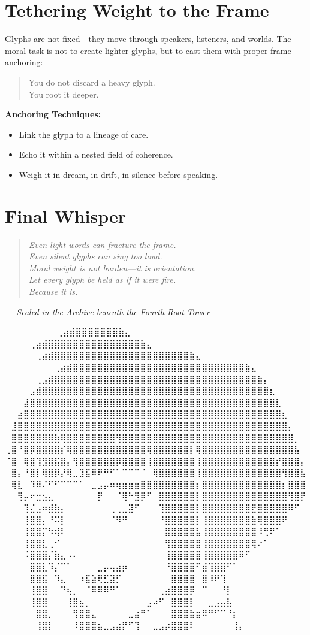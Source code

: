 \section*{Tethering Weight to the Frame}
Glyphs are not fixed—they move through speakers, listeners, and worlds.  
The moral task is not to create lighter glyphs, but to cast them with proper frame anchoring:
\begin{quote}
You do not discard a heavy glyph.\\
You root it deeper.
\end{quote}

\noindent\textbf{Anchoring Techniques:}
\begin{itemize}
    \item Link the glyph to a lineage of care.
    \item Echo it within a nested field of coherence.
    \item Weigh it in dream, in drift, in silence before speaking.
\end{itemize}

\section*{Final Whisper}
\begin{quote}\itshape
Even light words can fracture the frame.\\
Even silent glyphs can sing too loud.\\
Moral weight is not burden—it is orientation.\\
Let every glyph be held as if it were fire.\\
Because it is.
\end{quote}

\begin{flushright}
\textit{— Sealed in the Archive beneath the Fourth Root Tower}
\end{flushright}

\iffalse
⠀⠀⠀⠀⠀⠀             ⠀⠀⢀⣴⣾⣿⣿⣿⣿⣿⣿⣿⣷⣄⠀⠀⠀⠀⠀⠀⠀⠀
⠀⠀⠀  ⠀      ⠀⠀⠀⠀⢀⣴⣾⣿⣿⣿⣿⣿⣿⣿⣿⣿⣿⣿⣿⣿⣿⣿⣷⣄⠀⠀⠀⠀⠀⠀⠀⠀
⠀⠀ ⠀   ⠀⠀⠀⠀⠀⢀⣴⣾⣿⣿⣿⣿⣿⣿⣿⣿⣿⣿⣿⣿⣿⣿⣿⣿⣿⣿⣿⣿⣿⣿⣷⣄⠀⠀⠀⠀⠀⠀⠀⠀
⠀⠀⠀⠀⠀⠀⠀⠀⢀⣴⣾⣿⣿⣿⣿⣿⣿⣿⣿⣿⣿⣿⣿⣿⣿⣿⣿⣿⣿⣿⣿⣿⣿⣿⣿⣿⣿⣿⣿⣷⣄⠀⠀⠀⠀⠀⠀⠀⠀
⠀⠀⠀⠀⠀⢀⣠⣾⣿⣿⣿⣿⣿⣿⣿⣿⣿⣿⣿⣿⣿⣿⣿⣿⣿⣿⣿⣿⣿⣿⣿⣿⣿⣿⣿⣿⣿⣿⣿⣿⣿⣷⡄⠀⠀⠀⠀⠀⠀
⠀⠀⠀⠀⣠⣾⣿⣿⣿⣿⣿⣿⣿⣿⣿⣿⣿⣿⣿⣿⣿⣿⣿⣿⣿⣿⣿⣿⣿⣿⣿⣿⣿⣿⣿⣿⣿⣿⣿⣿⣿⣿⣿⣆⠀⠀⠀⠀⠀
⠀⠀⠀⣼⣿⣿⣿⣿⣿⣿⣿⣿⣿⣿⣿⣿⣿⣿⣿⣿⣿⣿⣿⣿⣿⣿⣿⣿⣿⣿⣿⣿⣿⣿⣿⣿⣿⣿⣿⣿⣿⣿⣿⣿⣇⠀⠀⠀⠀
⠀⠀⣴⣿⣿⣿⣿⣿⣿⣿⣿⣿⣿⣿⣿⣿⣿⣿⣿⣿⣿⣿⣿⣿⣿⣿⣿⣿⣿⣿⣿⣿⣿⣿⣿⣿⣿⣿⣿⣿⣿⣿⣿⣿⣿⣆⠀⠀⠀
⠀⣸⣿⣿⣿⣿⣿⣿⣿⣿⣿⣿⣿⣿⣿⣿⣿⣿⣿⣿⣿⣿⣿⣿⣿⣿⣿⣿⣿⣿⣿⣿⣿⣿⣿⣿⣿⣿⣿⣿⣿⣿⣿⣿⣿⣿⡄⠀⠀
⠀⣿⣿⣿⣿⣿⣿⣿⣷⢿⣿⣿⣿⣿⣿⣿⣿⣿⢻⣿⣿⣿⣿⣿⣿⣿⣿⣿⣿⣿⣿⣿⣿⣿⣿⣿⣿⣿⣿⣿⣿⣿⣿⣿⣿⣿⣿⡀⠀
⢀⣿⠘⣿⡿⣿⣿⣿⣿⡎⢿⣿⣿⣿⣿⣿⣿⣿⣿⣿⣿⣿⣿⢿⣿⣿⣿⣿⣿⣿⡇⢿⣿⣿⣿⣿⣿⣿⣿⣿⣿⣿⣿⣿⣿⣿⣿⣧⠀
⠈⣿⠀⢿⣿⢹⣻⣿⣯⣿⡄⢻⣿⣿⣿⣿⣿⣿⡿⣿⣿⣿⣿⢸⣿⣿⣿⣿⣿⣿⣿⢸⣿⣿⣿⣿⣿⣿⣿⣿⣿⣿⣿⣿⡞⣿⣿⣿⡄
⠀⣿⡄⠘⣿⡇⢿⣿⡿⡜⢿⣀⣹⣯⠿⠟⠛⠋⠁⠉⠉⠉⠈⠀⢿⣿⣿⣿⣿⣿⣿⢸⣿⣿⣿⣿⣿⣿⣿⣿⣿⣿⣿⣿⣿⢻⣿⣿⣧
⠀⢿⣇⠀⠹⠿⠌⠋⠋⠉⠉⠉⠁⠀⣀⣠⡤⠶⢶⣶⣶⣶⣿⣿⣿⣿⣿⣿⣿⣿⣿⡆⣿⣿⣿⣿⣿⣿⣿⣿⣿⣿⣿⣿⣿⡆⣿⣿⣿
⠀⠀⢻⡤⠖⣒⣢⣄⠀⠀⠀⠀⠀⠀⠀⡟⠀⠀⠈⢿⠓⣻⡿⠋⠀⣿⣿⣿⣿⣿⣿⡇⣿⣿⣿⣿⣿⣿⣿⣿⣿⣿⣿⣿⣿⣿⢻⣿⡟
⠀⠀⠀⢹⣌⣠⠶⣾⣷⡄⠀⠀⠀⠀⠀⠀⠀⢀⢀⣀⣽⠋⠀⠀⠀⢹⣿⣿⣿⣿⣿⡇⣿⣿⣿⣿⣿⣿⣿⣿⣟⣿⣿⣿⣿⣿⠿⠋⠀
⠀⠀⠀⢸⣿⣿⡄⠘⠭⡇⠀⠀⠀⠀⠀⠀⠀⠈⠻⠛⠀⠀⠀⠀⠀⠘⣿⣿⣿⣿⣿⡇⢸⣿⣿⣿⣿⣿⣿⣿⣷⢿⣿⣿⣿⠟⠀⠀⠀
⠀⠀⠀⢸⣿⣿⡍⠳⢾⠇⠀⠀⠀⠀⠀⠀⠀⠀⠀⠀⠀⠀⠀⠀⠀⠀⣿⣿⣿⣿⣿⣧⢸⣿⣿⣿⣿⣿⣿⣿⣿⠸⢛⠟⠁⠀⠀⠀⠀
⠀⠀⠀⢸⣿⣿⣇⢀⠊⠀⠀⠀⠀⠀⠀⠀⠀⠀⠀⠀⠀⠀⠀⠀⠀⠀⢻⣿⣿⣿⣿⣿⢸⣿⣿⣿⣿⣿⣿⣿⢿⠔⠁⠀⠀⠀⠀⠀⠀
⠀⠀⠀⠨⣿⣿⣿⡌⣷⣄⠠⠄⠀⠀⠀⠀⠀⠀⠀⠀⠀⠀⠀⠀⠀⠀⢸⣿⣿⣿⣿⣿⢸⣿⣿⣿⣿⣿⠿⠋⠀⠀⠀⠀⠀⠀⠀⠀⠀
⠀⠀⠀⠀⣿⣿⣇⠹⡌⠉⠁⠀⠀⠀⠀⣀⡤⢤⣴⡶⠀⠀⠀⠀⠀⠀⠘⣿⣿⣿⣿⠋⣾⢹⣿⣿⠋⠁⠀⠀⠀⠀⠀⠀⠀⠀⠀⠀⠀
⠀⠀⠀⠀⣿⣿⣯⠀⠹⣄⠀⠀⠰⣯⣵⢟⣋⣽⡋⠀⠀⠀⠀⠀⠀⠀⠀⣿⣿⣿⣿⠀⣿⠸⠟⢹⠀⠀⠀⠀⠀⠀⠀⠀⠀⠀⠀⠀⠀
⠀⠀⠀⠀⢸⣿⣿⠀⠀⠙⢦⡀⠀⠈⠿⠿⠿⠛⠁⠀⠀⠀⠀⠀⠀⢀⣴⣿⣿⣿⡿⠀⠉⠀⠀⠘⡇⠀⠀⠀⠀⠀⠀⠀⠀⠀⠀⠀⠀
⠀⠀⠀⠀⢸⣿⣿⠀⠀⠀⢸⣿⣦⡀⠀⠀⠀⠀⠀⠀⠀⠀⠀⣠⠴⠋⠀⣿⣿⣿⡇⠀⠀⣀⣠⣤⣧⠀⠀⠀⠀⠀⠀⠀⠀⠀⠀⠀⠀
⠀⠀⠀⠀⠀⣿⣿⡀⠀⠀⠀⢻⣿⣿⣄⠀⠀⠀⠀⠀⣀⣴⠛⠁⠀⠀⠀⣿⣿⣿⣷⣶⠿⠛⠋⠉⠘⡆⠀⠀⠀⠀⠀⠀⠀⠀⠀⠀⠀
⠀⠀⠀⠀⠀⢸⣿⡇⠀⠀⠀⠸⣿⣿⣿⣦⣀⣠⣴⡟⠋⢹⠀⠀⣀⣠⡴⣿⣿⣿⠇⠀⠀⠀⠀⠀⠀⢸⡄⠀⠀⠀⠀⠀⠀⠀⠀⠀⠀

